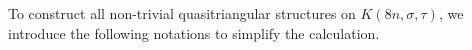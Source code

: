 \documentclass[a4paper,11pt]{amsart}
\numberwithin{equation}{section}
\begin{document}
%



To construct all non-trivial quasitriangular structures on $K(8n,\sigma,\tau)$, we introduce the following notations to simplify the calculation.
\end{document}
